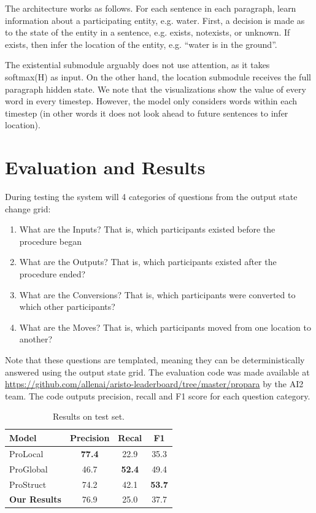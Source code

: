 \documentclass[11pt,a4paper]{article}
\begin{document}
The architecture works as follows. For each sentence in each paragraph, learn information about a participating entity, e.g. water. First, a decision is made as to the state of the entity in a sentence, e.g. exists, notexists, or unknown. If exists, then infer the location of the entity, e.g. “water is in the ground”.

The existential submodule arguably does not use attention, as it takes softmax(H) as input. On the other hand, the location submodule receives the full paragraph hidden state. We note that the visualizations show the value of every word in every timestep. However, the model only considers words within each timestep (in other words it does not look ahead to future sentences to infer location).

\section{Evaluation and Results}

During testing the system will 4 categories of questions from the output 
state change grid: 

\begin{enumerate}
  \item What are the Inputs? That is, which participants existed before the 
  	  procedure began
  \item What are the Outputs? That is, which participants existed after 
	  the procedure ended?
  \item What are the Conversions? That is, which participants were 
  	  converted to which other participants?
  \item What are the Moves? That is, which participants 
	   moved from one location to another?
\end{enumerate}

Note that these questions are templated, meaning they can be deterministically 
answered using the output state grid. The evaluation code was made available 
at \url{https://github.com/allenai/aristo-leaderboard/tree/master/propara} by 
the AI2 team. The code outputs precision, recall and F1 score for each 
question category.

\begin{table}[t!]
\begin{center}
\begin{tabular}{|l|ccc|}
\hline  \bf Model &  \bf Precision &  \bf Recal &  \bf F1 \\ \hline
ProLocal & \bf 77.4 & 22.9 & 35.3 \\
ProGlobal & 46.7 & \bf 52.4 & 49.4 \\
ProStruct & 74.2 & 42.1 & \bf 53.7 \\
\hline
\bf Our Results & 76.9 & 25.0 & 37.7 \\
\hline
\end{tabular}
\end{center}
\caption{ Results on test set. }
\end{table}
\end{document}
